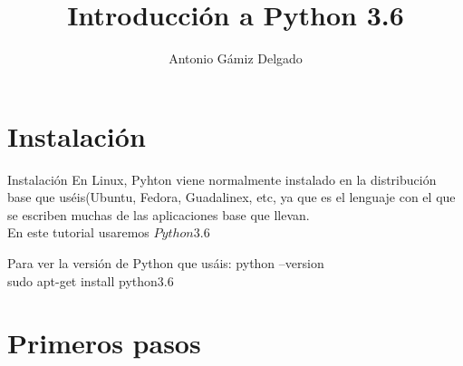\documentclass{beamer}
\title[Python 3.6]{Introducción a Python 3.6}
\author{Antonio Gámiz Delgado}
\begin{document}
\begin{frame}
\titlepage
\end{frame}

\begin{frame}
\tableofcontents
\end{frame}

\section{Instalación}

\begin{frame}{Instalación}
	En Linux, Pyhton viene normalmente instalado en la distribución base que uséis(Ubuntu, Fedora, Guadalinex, etc, ya que es el lenguaje con el que se escriben muchas de las aplicaciones base que llevan. \\
	En este tutorial usaremos $Python3$.$6$
	\begin{block}{Para ver la versión de Python que usáis:}
	python --version \\
	sudo apt-get install python3.6
	\end{block}
\end{frame}

\section{Primeros pasos}
\end{document}
